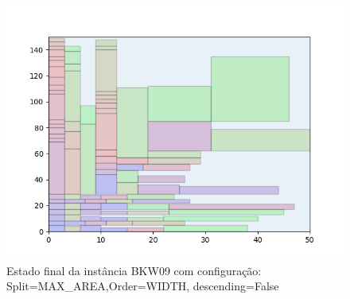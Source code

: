 \begin{figure}[H]
    \centering
    \caption[]{Estado final da instância BKW09 com configuração: Split=MAX_AREA,Order=WIDTH, descending=False}
    \label{fig:bkw09-max_area-width-false}
    \includegraphics[scale=0.5]{output/figures/bkw/bkw09/max_area/width/false/000}
\end{figure}